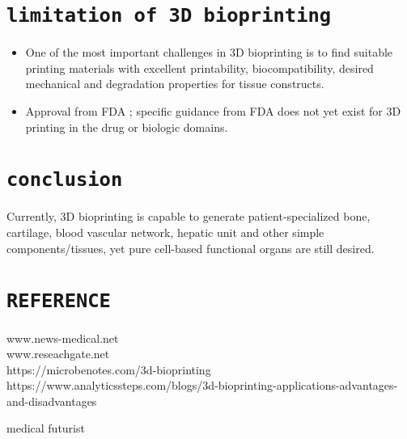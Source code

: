 \documentclass[11pt]{article}
\begin{document}
\section{\Large\texttt{limitation of 3D bioprinting}}
\begin{itemize}
\item  One of the most important challenges in 3D bioprinting is to find suitable printing materials with excellent printability, biocompatibility, desired mechanical and degradation properties for tissue constructs.\\
\item Approval from FDA ; specific guidance from FDA does not yet exist for 3D printing in the drug or biologic domains.

\end{itemize}
\section{\Large\texttt{conclusion}}
Currently, 3D bioprinting is capable to generate patient-specialized bone, cartilage, blood vascular network, hepatic unit and other simple components/tissues, yet pure cell-based functional organs are still desired.

\pagebreak
\section{\Large\texttt{REFERENCE}}
www.news-medical.net\\
www.reseachgate.net\\

 https://microbenotes.com/3d-bioprinting\\
 
https://www.analyticssteps.com/blogs/3d-bioprinting-applications-advantages-and-disadvantages

medical futurist
\end{document}
